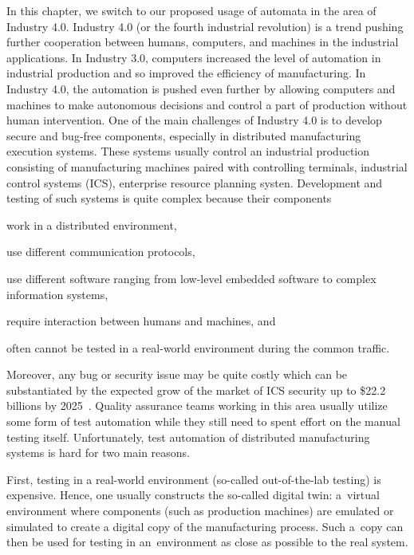 {In this chapter, we switch to our proposed usage of automata in the area of Industry 4.0.
Industry 4.0 (or the fourth industrial revolution) is a trend pushing
further cooperation between humans, computers, and machines in the industrial applications.
In Industry 3.0, computers increased the level of automation in industrial production
and so improved the efficiency of manufacturing.
In Industry 4.0, the automation is pushed even further by allowing computers
and machines to make autonomous decisions and control a part of production without human intervention.
One of the main challenges of Industry 4.0 is to develop secure and
bug-free components, especially in distributed manufacturing execution
systems. These systems usually control an industrial production consisting of manufacturing machines paired with
controlling terminals, industrial control systems (ICS), enterprise resource planning systen.
Development and testing of such systems is quite complex because their
components
%
\begin{inparaenum}[(1)]
%
 \item work in a distributed environment,
%
 \item use different communication protocols, 
%
 \item use different software ranging from low-level embedded software to
 complex information systems, 
%
 \item require interaction between humans and machines, and
%
 \item often cannot be tested in a real-world environment during the common
 traffic.
%
\end{inparaenum}

Moreover, any bug or security issue may be quite costly which can be
substantiated by the expected grow of the market of ICS security up to \$22.2
billions by 2025~\cite{ref_market}.
%
Quality assurance teams working in this area usually utilize some form of test automation 
while they still need to spent effort on the manual testing itself. Unfortunately, test
automation of distributed manufacturing systems is hard for two main reasons.


First, testing in a real-world environment (so-called out-of-the-lab testing)
is expensive.  Hence, one usually constructs the so-called digital twin:
a~virtual environment where components (such as production machines) are
emulated or simulated to create a digital copy of the manufacturing process.  
%
Such a~copy can then be used for testing in an~environment as close as possible
to the real system.

}
